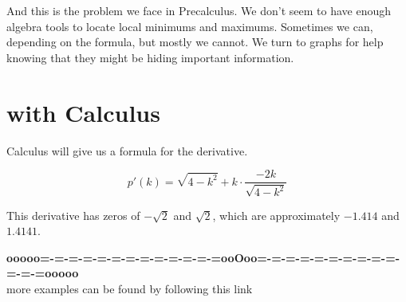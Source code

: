 \documentclass{ximera}
\begin{document}
And this is the problem we face in Precalculus. We don't seem to have enough algebra tools to locate local minimums and maximums. Sometimes we can, depending on the formula, but mostly we cannot. We turn to graphs for help knowing that they might be hiding important information.\\


\section{with Calculus}


Calculus will give us a formula for the derivative.

\[    p'(k) = \sqrt{4 - k^2} + k \cdot \frac{-2k}{\sqrt{4-k^2}}  \]


This derivative has zeros of $-\sqrt{2}$ and $\sqrt{2}$, which are approximately $-1.414$ and $1.4141$. 











\begin{center}
\textbf{\textcolor{green!50!black}{ooooo=-=-=-=-=-=-=-=-=-=-=-=-=ooOoo=-=-=-=-=-=-=-=-=-=-=-=-=ooooo}} \\

more examples can be found by following this link\\ 

\end{center}
\end{document}
